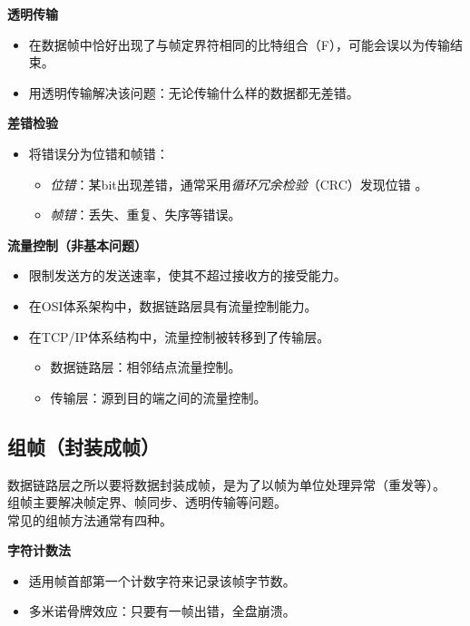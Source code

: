 \documentclass[b5paper, twoside]{article}
\let\oldtextbf\textbf
\renewcommand{\textbf}[1]{\textcolor{myblue}{\oldtextbf{#1}}}
\let\oldemph\emph
\renewcommand{\emph}[1]{{\oldemph{#1}}}
\begin{document}
\textbf{透明传输}
\begin{itemize}
	\item 在数据帧中恰好出现了与帧定界符相同的比特组合（F），可能会误以为传输结束。
	\item 用透明传输解决该问题：无论传输什么样的数据都无差错。
\end{itemize}

\textbf{差错检验}
\begin{itemize}
	\item 将错误分为位错和帧错：
	\begin{itemize}
		\item \emph{位错}：某bit出现差错，通常采用\emph{循环冗余检验}（CRC）发现位错
		。
		\item \emph{帧错}：丢失、重复、失序等错误。
	\end{itemize}
\end{itemize}

\textbf{流量控制（非基本问题）}
\begin{itemize}
	\item 限制发送方的发送速率，使其不超过接收方的接受能力。
	\item 在OSI体系架构中，数据链路层具有流量控制能力。
	\item 在TCP/IP体系结构中，流量控制被转移到了传输层。
	\begin{itemize}
		\item 数据链路层：相邻结点流量控制。
		\item 传输层：源到目的端之间的流量控制。
	\end{itemize}
\end{itemize}

\subsection{组帧（封装成帧）}

数据链路层之所以要将数据封装成帧，是为了以帧为单位处理异常（重发等）。
\\组帧主要解决帧定界、帧同步、透明传输等问题。
\\常见的组帧方法通常有四种。

\textbf{字符计数法}
\begin{itemize}
	\item 适用帧首部第一个计数字符来记录该帧字节数。
	\item 多米诺骨牌效应：只要有一帧出错，全盘崩溃。
\end{itemize}
\end{document}
